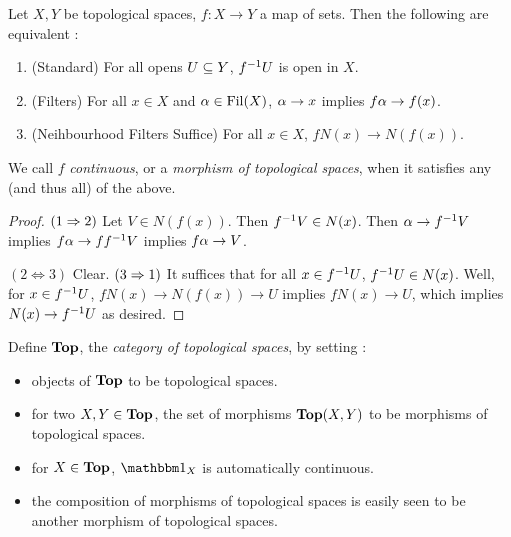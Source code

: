 \documentclass[main.tex]{subfiles}
\begin{document}
\begin{prop} 
  
  Let $X, Y$ be topological spaces, $f : X \to Y$ a map of sets. 
  Then the following are equivalent : 
  \begin{enumerate}
    \item (Standard) For all opens $U \subseteq Y$, $f^{-1} U$ is open in $X$.
    \item (Filters) For all $x \in X$ and $\alpha \in \operatorname{Fil}(X)$,
    $\alpha \to x$ implies $f\alpha \to f(x)$.
    \item (Neihbourhood Filters Suffice)
    For all $x \in X$, $f N(x) \to N(f(x))$.
  \end{enumerate}
  We call $f$ \emph{continuous}, or a \emph{morphism of topological spaces},
  when it satisfies any (and thus all) of the above. 
\end{prop}
\begin{proof}
% 
% 

  $(1 \Rightarrow 2)$
  Let $V \in N(f(x))$. Then $f^{-1} V \in N(x)$.
  Then $\alpha \to f^{-1} V$ implies $f \alpha \to f f^{-1} V$ implies $f \alpha \to V$.

  $(2 \iff 3)$ Clear. 
  $(3 \Rightarrow 1)$
  It suffices that for all $x \in f^{-1} U$, $f^{-1} U \in N(x)$.
  Well, for $x \in f^{-1} U$, 
  $fN(x) \to N(f(x)) \to U$ implies $fN(x) \to U$,
  which implies $N(x) \to f^{-1} U$ as desired. 
\end{proof}

\begin{dfn}
  
  Define $\mathbf{Top}$, the \emph{category of topological spaces}, by setting :
  \begin{itemize}
    \item objects of $\mathbf{Top}$ to be topological spaces.
    \item for two $X,Y \in \mathbf{Top}$, the set of 
    morphisms $\mathbf{Top}(X,Y)$ to be morphisms of topological spaces. 
    \item for $X \in \mathbf{Top}$, $\id{X}$ is automatically continuous. 
    \item the composition of morphisms of topological spaces 
    is easily seen to be another morphism of topological spaces. 
  \end{itemize}
\end{dfn}
\end{document}
